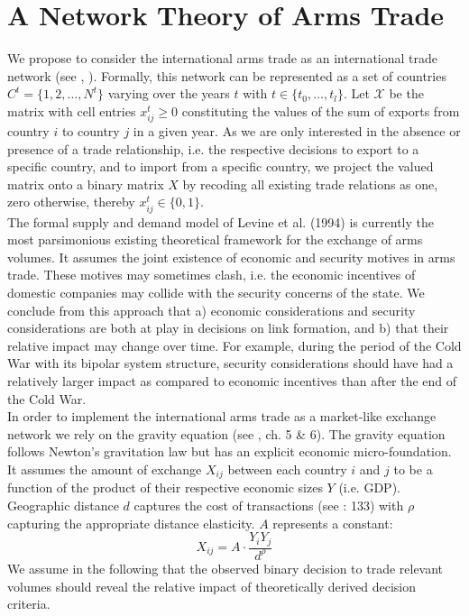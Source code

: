 \documentclass[12pt, letterpaper]{article}
\numberwithin{equation}{section}
\begin{document}
\section{A Network Theory of Arms Trade }\label{hypo}

We propose to consider the international arms trade as an international trade network (see \cite{Ward:2007}, \cite{WaAhAr:13}). Formally, this network can be represented as a set of countries $C^t = \{1,2, \dots, N^t\}$ varying over the years $t$ with $t \in \{t_0, \dots ,t_l\}$. Let $\mathcal{X}$ be the matrix with cell entries  $x_{ij}^t \geq0$ constituting the values of the sum of exports from country $i$ to country $j$ in a given year. As we are only interested in the absence or presence of a trade relationship, i.e. the respective decisions to export to a specific country, and to import from a specific country, we project the valued matrix onto a binary matrix $X$ by recoding all existing trade relations as one, zero otherwise, thereby $x_{ij}^t  \in \{0,1\}$. \\
The formal supply and demand model of Levine et al. (1994) is currently the most parsimonious existing theoretical framework for the exchange of arms volumes. It assumes the joint existence of economic and security motives in arms trade. These motives may sometimes clash, i.e. the economic incentives of domestic companies may collide with the security concerns of the state. We conclude from this approach that a) economic considerations and security considerations are both at play in decisions on link formation, and b) that their relative impact may change over time. For example, during the period of the Cold War with its bipolar system structure, security considerations should have had a relatively larger impact as compared to economic incentives than after the end of the Cold War. \\
In order to implement the international arms trade as a market-like exchange network we rely on the gravity equation (see \cite{WaAhAr:13}, \cite{Feenstra16} ch. 5 \& 6). The gravity equation follows Newton’s gravitation law but has an explicit economic micro-foundation. It assumes the amount of exchange $X_{ij}$ between each country $i$ and $j$ to be a function of the product of their respective economic sizes $Y$ (i.e. GDP). Geographic distance $d$ captures the cost of transactions (see \cite{Feenstra16}: 133) with $\rho$ capturing the appropriate distance elasticity. $A$ represents a constant:  
$$X_{ij} =A \cdot \frac{Y_i Y_j}{d^\rho}$$
We assume in the following that the observed binary decision to trade relevant volumes should reveal the relative impact of theoretically derived decision criteria. 
\end{document}
